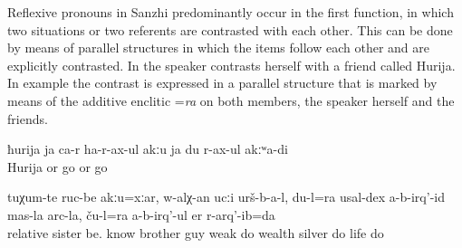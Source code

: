 Reflexive pronouns in Sanzhi predominantly occur in the first function, in which two situations or two referents are contrasted with each other. This can be done by means of parallel structures in which the items follow each other and are explicitly contrasted. In  the speaker contrasts herself with a friend called Hurija. In example  the contrast is expressed in a parallel structure that is marked by means of the additive enclitic =\textit{ra} on both members, the speaker herself and the friends.
%
\begin{exe}
	\ex	\label{ex:Neither Xurija herself comes (to me) nor do I go (to her)@3c}
	\gll	ħurija	ja	ca-r	ha-r-ax-ul	akːu	ja	du	r-ax-ul	akːʷa-di\\
		Hurija	or		go		or		go	\\
	\glt	{}

	\ex	\label{ex:‎Although there were no brothers (relatives) and sisters@6b}
	\gll	tuχum-te	ruc-be	akːu=xːar,	w-alχ-an	ucːi	urš-b-a-l,	du-l=ra usal-dex	a-b-irq'-id	mas-la	arc-la, ču-l=ra	a-b-irq'-ul	er	r-arq'-ib=da\\
		relative	sister	be.	know	brother	guy		weak	do	wealth\tsc{-gen}	silver		do	life	do\\
	\glt	{}
\end{exe}

